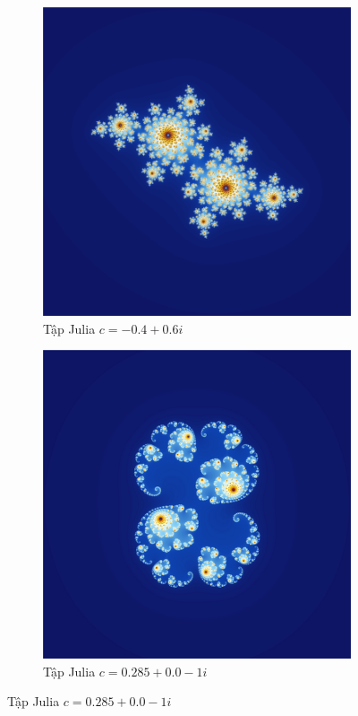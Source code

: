 \documentclass[oneside,final]{report}
\begin{document}
  \begin{figure}[H] %
    \centering

    \begin{subfigure}[b]{0.3\textwidth}
        \centering
        \includegraphics[width=\textwidth]{assets/images/Julia-0.4_0.6.png}  %
        \caption{Tập Julia $c = -0.4 + 0.6i$}
        \label{fig:julia_set_1}
    \end{subfigure}
    \begin{subfigure}[b]{0.3\textwidth}
        \centering
        \includegraphics[width=\textwidth]{assets/images/julia-0.285_0.0_-01.png} 
        \caption{Tập Julia $c=0.285+0.0-1i$}
        \label{fig:julia_set_2}


\end{subfigure}
\end{figure}
\end{document}
